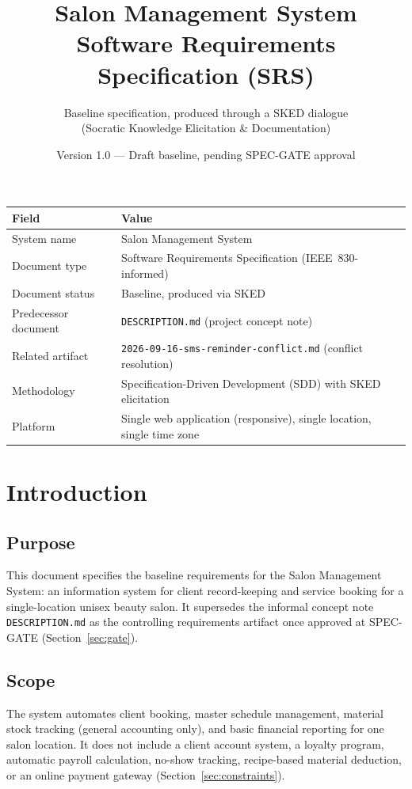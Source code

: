 \documentclass[11pt,a4paper]{article}
\title{Salon Management System\\
\large Software Requirements Specification (SRS)}
\author{Baseline specification, produced through a SKED dialogue \\ (Socratic Knowledge Elicitation \& Documentation)}
\date{Version 1.0 --- Draft baseline, pending SPEC-GATE approval}
\begin{document}
\maketitle

\begin{center}
\begin{tabularx}{0.9\textwidth}{@{}lX@{}}
\toprule
Field & Value \\
\midrule
System name & Salon Management System \\
Document type & Software Requirements Specification (IEEE~830-informed) \\
Document status & Baseline, produced via SKED \\
Predecessor document & \texttt{DESCRIPTION.md} (project concept note) \\
Related artifact & \texttt{2026-09-16-sms-reminder-conflict.md} (conflict resolution) \\
Methodology & Specification-Driven Development (SDD) with SKED elicitation \\
Platform & Single web application (responsive), single location, single time zone \\
\bottomrule
\end{tabularx}
\end{center}

\tableofcontents
\newpage

\section{Introduction}

\subsection{Purpose}
This document specifies the baseline requirements for the Salon Management
System: an information system for client record-keeping and service booking
for a single-location unisex beauty salon. It supersedes the informal
concept note \texttt{DESCRIPTION.md} as the controlling requirements
artifact once approved at SPEC-GATE (Section~\ref{sec:gate}).

\subsection{Scope}
The system automates client booking, master schedule management, material
stock tracking (general accounting only), and basic financial reporting for
one salon location. It does not include a client account system, a loyalty
program, automatic payroll calculation, no-show tracking, recipe-based
material deduction, or an online payment gateway (Section~\ref{sec:constraints}).
\end{document}
